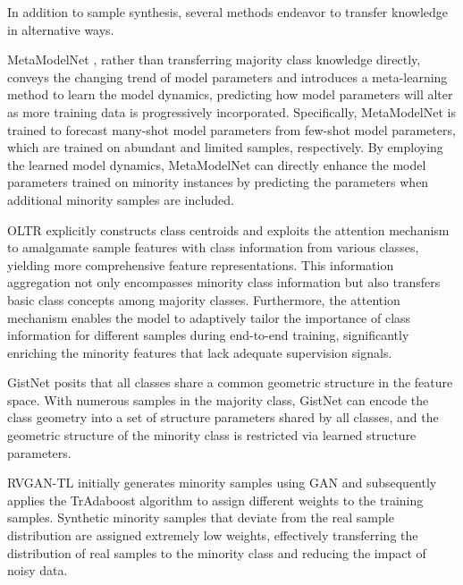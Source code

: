 In addition to sample synthesis, several methods endeavor to transfer knowledge in alternative ways.

MetaModelNet \cite{wang2017learning}, rather than transferring majority class knowledge directly, conveys the changing trend of model parameters and introduces a meta-learning method to learn the model dynamics, predicting how model parameters will alter as more training data is progressively incorporated. Specifically, MetaModelNet is trained to forecast many-shot model parameters from few-shot model parameters, which are trained on abundant and limited samples, respectively. By employing the learned model dynamics, MetaModelNet can directly enhance the model parameters trained on minority instances by predicting the parameters when additional minority samples are included.

OLTR \cite{liu2019large} explicitly constructs class centroids and exploits the attention mechanism to amalgamate sample features with class information from various classes, yielding more comprehensive feature representations. This information aggregation not only encompasses minority class information but also transfers basic class concepts among majority classes. Furthermore, the attention mechanism enables the model to adaptively tailor the importance of class information for different samples during end-to-end training, significantly enriching the minority features that lack adequate supervision signals.


GistNet \cite{liu2021gistnet} posits that all classes share a common geometric structure in the feature space. With numerous samples in the majority class, GistNet can encode the class geometry into a set of structure parameters shared by all classes, and the geometric structure of the minority class is restricted via learned structure parameters.

RVGAN-TL \cite{ding2023rvgan} initially generates minority samples using GAN and subsequently applies the TrAdaboost algorithm \cite{tradaboost} to assign different weights to the training samples. Synthetic minority samples that deviate from the real sample distribution are assigned extremely low weights, effectively transferring the distribution of real samples to the minority class and reducing the impact of noisy data.





